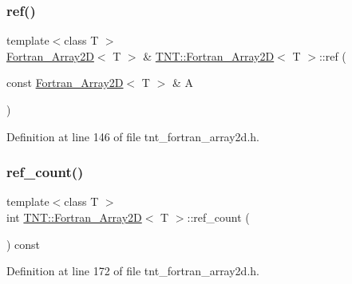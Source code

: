 \subsubsection{\texorpdfstring{ref()}{ref()}}
{\footnotesize\ttfamily template$<$class T $>$ \\
\hyperlink{classTNT_1_1Fortran__Array2D}{Fortran\+\_\+\+Array2D}$<$ T $>$ \& \hyperlink{classTNT_1_1Fortran__Array2D}{T\+N\+T\+::\+Fortran\+\_\+\+Array2D}$<$ T $>$\+::ref (\begin{DoxyParamCaption}\item[{const \hyperlink{classTNT_1_1Fortran__Array2D}{Fortran\+\_\+\+Array2D}$<$ T $>$ \&}]{A }\end{DoxyParamCaption})\hspace{0.3cm}{\ttfamily [inline]}}



Definition at line 146 of file tnt\+\_\+fortran\+\_\+array2d.\+h.

\mbox{\label{classTNT_1_1Fortran__Array2D_a86c14fd24e1943b267a16f83d572739d}} 
\subsubsection{\texorpdfstring{ref\+\_\+count()}{ref\_count()}}
{\footnotesize\ttfamily template$<$class T $>$ \\
int \hyperlink{classTNT_1_1Fortran__Array2D}{T\+N\+T\+::\+Fortran\+\_\+\+Array2D}$<$ T $>$\+::ref\+\_\+count (\begin{DoxyParamCaption}{ }\end{DoxyParamCaption}) const\hspace{0.3cm}{\ttfamily [inline]}}



Definition at line 172 of file tnt\+\_\+fortran\+\_\+array2d.\+h.

\mbox{\label{classTNT_1_1Fortran__Array2D_a5b371e6ec0f42a898c675c7daf643a4e}} 
